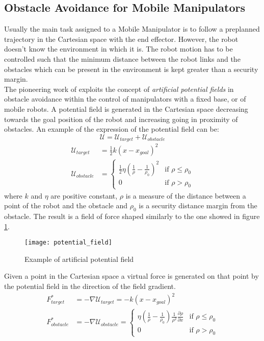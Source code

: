 \subsection{Obstacle Avoidance for Mobile Manipulators}
Usually the main task assigned to a Mobile Manipulator is to follow a preplanned trajectory in the Cartesian space with the end effector. However, the robot doesn't know the environment in which it is. The robot motion has to be controlled such that the minimum distance between the robot links and the obstacles which can be present in the environment is kept greater than a security margin.\\
The pioneering work of \cite{khatib1986} exploits the concept of \textit{artificial potential fields} in obstacle avoidance within the control of manipulators with a fixed base, or of mobile robots. A potential field is generated in the Cartesian space decreasing towards the goal position of the robot and increasing going in proximity of obstacles. An example of the expression of the potential field can be: 
\begin{equation}
	\mathcal{U}=\mathcal{U}_{target}+\mathcal{U}_{obstacle}
\end{equation}
\begin{equation}
	\begin{split}
	\mathcal{U}_{target}&=\frac{1}{2}k\left(x-x_{goal}\right)^2 \\
	\mathcal{U}_{obstacle}&=\begin{cases}
		\frac{1}{2}\eta\left(\frac{1}{\rho}-\frac{1}{\rho_0}\right)^2 & \text{if } \rho\leq\rho_0 \\
		0 & \text{if } \rho>\rho_0
	\end{cases}
	\end{split}
\end{equation}
where $k$ and $\eta$ are positive constant, $\rho$ is a measure of the distance between a point of the robot and the obstacle and $\rho_0$ is a security distance margin from the obstacle. The result is a field of force shaped similarly to the one showed in figure \ref{potential_field}.
\begin{figure}[h!]
	\centering
	\texttt{[image: potential\_field]}
	\caption{Example of artificial potential field}
	\label{potential_field}
\end{figure}
Given a point in the Cartesian space a virtual force is generated on that point by the potential field in the direction of the field gradient. 
\begin{equation}
\begin{split}
F^*_{target}&=-\nabla\mathcal{U}_{target}=-k\left(x-x_{goal}\right)^2 \\
F^*_{obstacle}&=-\nabla\mathcal{U}_{obstacle}=\begin{cases}\eta\left(\frac{1}{\rho}-\frac{1}{\rho_0}\right)\frac{1}{\rho^2}\frac{\partial\rho}{\partial x}& \text{if } \rho\leq\rho_0 \\
0 & \text{if } \rho>\rho_0
\end{cases}
\end{split}
\end{equation}

